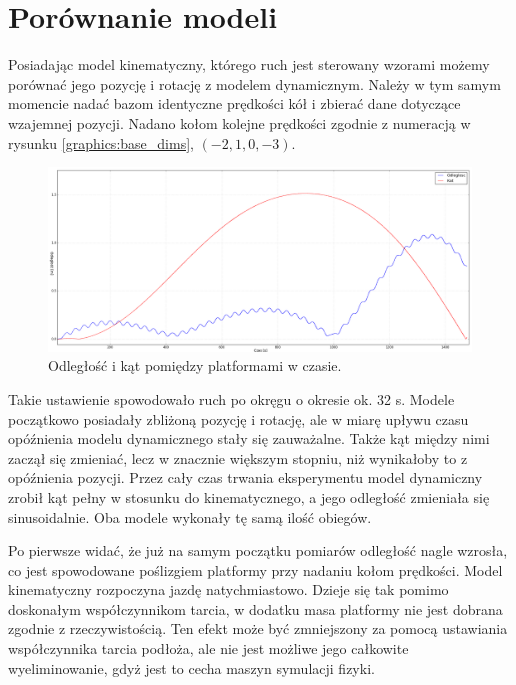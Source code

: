 \section{Porównanie modeli}
Posiadając model kinematyczny, którego ruch jest sterowany wzorami możemy porównać jego pozycję i rotację z modelem dynamicznym.
Należy w tym samym momencie nadać bazom identyczne prędkości kół i zbierać dane dotyczące wzajemnej pozycji.
Nadano kołom kolejne prędkości zgodnie z numeracją w rysunku \ref{graphics:base_dims}, $(-2 , 1 , 0 , -3)$.

\begin{figure}[H]
\centering
 \includegraphics[width=\textwidth]{graphics/test1.png}
\caption{Odległość i kąt pomiędzy platformami w czasie.}
\end{figure} 

Takie ustawienie spowodowało ruch po okręgu o okresie ok. 32 s.
Modele początkowo posiadały zbliżoną pozycję i rotację, ale w miarę upływu czasu opóźnienia modelu dynamicznego stały się zauważalne.
Także kąt między nimi zaczął się zmieniać, lecz w znacznie większym stopniu, niż wynikałoby to z opóźnienia pozycji.
Przez cały czas trwania eksperymentu model dynamiczny zrobił kąt pełny w stosunku do kinematycznego, a jego odległość zmieniała się sinusoidalnie.
Oba modele wykonały tę samą ilość obiegów.

Po pierwsze widać, że już na samym początku pomiarów odległość nagle wzrosła, co jest spowodowane poślizgiem platformy przy nadaniu kołom prędkości.
Model kinematyczny rozpoczyna jazdę natychmiastowo.
Dzieje się tak pomimo doskonałym współczynnikom tarcia, w dodatku masa platformy nie jest dobrana zgodnie z rzeczywistością.
Ten efekt może być zmniejszony za pomocą ustawiania współczynnika tarcia podłoża, ale nie jest możliwe jego całkowite wyeliminowanie, gdyż jest to cecha maszyn symulacji fizyki.

